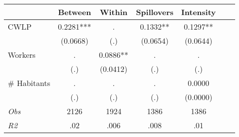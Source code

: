 \begin{tabular}{l*{6}{c}}\hline&\multicolumn{1}{c}{Between}&\multicolumn{1}{c}{Within}&\multicolumn{1}{c}{Spillovers}&\multicolumn{1}{c}{Intensity}\\ \hline 
CWLP & 0.2281*** & . & 0.1332** & 0.1297** \\
 & (0.0668) & (.) & (0.0654) & (0.0644) \\
Workers & . & 0.0886** & . & . \\
 & (.) & (0.0412) & (.) & (.) \\
\# Habitants & . & . & . & 0.0000 \\
  & (.) & (.) & (.) & (0.0000) \\
\hline \textit{Obs} & 2126 & 1924 & 1386 & 1386  \\ \textit{R2} & .02 & .006 & .008 & .01 \\ \hline \end{tabular}
